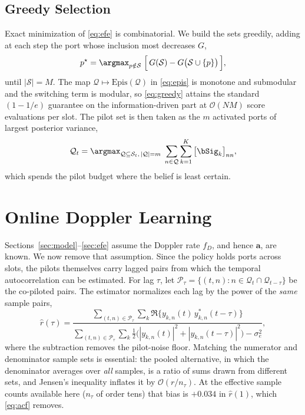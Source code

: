 \subsection{Greedy Selection}
Exact minimization of \eqref{eq:efe} is combinatorial. We build the sets
greedily, adding at each step the port whose inclusion most decreases $G$,
\begin{equation}
  p^{\star} = \argmax_{p\notin\mathcal{S}}\;
    \Big[\,G(\mathcal{S}) - G\big(\mathcal{S}\cup\{p\}\big)\,\Big],
  \label{eq:greedy}
\end{equation}
until $|\mathcal{S}|=M$. The map
$\mathcal{Q}\mapsto\mathrm{Epis}(\mathcal{Q})$ in \eqref{eq:epis} is monotone
and submodular and the switching term is modular, so \eqref{eq:greedy} attains
the standard $(1-1/e)$ guarantee on the information-driven part at
$\mathcal{O}(NM)$ score evaluations per slot. The pilot set is then taken as
the $m$ activated ports of largest posterior variance,
\begin{equation}
  \mathcal{Q}_t = \argmax_{\mathcal{Q}\subseteq\mathcal{S}_t,\,|\mathcal{Q}|=m}
    \;\sum_{n\in\mathcal{Q}}\sum_{k=1}^{K}\big[\bSig_k\big]_{nn},
  \label{eq:pilotsel}
\end{equation}
which spends the pilot budget where the belief is least certain.

\section{Online Doppler Learning}
\label{sec:learn}

Sections~\ref{sec:model}--\ref{sec:efe} assume the Doppler rate $f_D$, and
hence $\mathbf{a}$, are known. We now remove that assumption. Since the policy
holds ports across slots, the pilots themselves carry lagged pairs from which
the temporal autocorrelation can be estimated. For lag $\tau$, let
$\mathcal{P}_\tau=\{(t,n):n\in\mathcal{Q}_t\cap\mathcal{Q}_{t-\tau}\}$ be the
co-piloted pairs. The estimator normalizes each lag by the power of the
\emph{same} sample pairs,
\begin{equation}
  \hat{r}(\tau) =
  \frac{\sum_{(t,n)\in\mathcal{P}_\tau}\sum_{k}
        \Re\big\{y_{k,n}(t)\,y_{k,n}^{*}(t-\tau)\big\}}
       {\sum_{(t,n)\in\mathcal{P}_\tau}\sum_{k}
        \tfrac{1}{2}\big(|y_{k,n}(t)|^2+|y_{k,n}(t-\tau)|^2\big)
        - \sigma_e^2},
  \label{eq:acf}
\end{equation}
where the subtraction removes the pilot-noise floor. Matching the numerator and
denominator sample sets is essential: the pooled alternative, in which the
denominator averages over \emph{all} samples, is a ratio of sums drawn from
different sets, and Jensen's inequality inflates it by $\mathcal{O}(r/n_\tau)$.
At the effective sample counts available here ($n_\tau$ of order tens) that
bias is $+0.034$ in $\hat{r}(1)$, which \eqref{eq:acf} removes.

